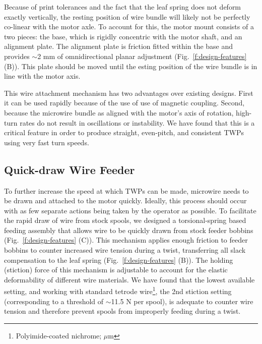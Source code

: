 \documentclass[11pt,a4paper]{article}
\begin{document}
Because of print tolerances and the fact that the leaf spring does not deform
exactly vertically, the resting position of wire bundle will likely not be
perfectly co-linear with the motor axle. To account for this, the motor mount
consists of a two pieces: the base, which is rigidly concentric with the motor
shaft, and an alignment plate. The alignment plate is friction fitted within
the base and provides $\sim$2 mm of omnidirectional planar adjustment
(Fig.~\ref{f:design-features} (B)). This plate should be moved until the
esting position of the wire bundle is in line with the motor axis.

This wire attachment mechanism has two advantages over existing designs. First it
can be used rapidly because of the use of use of magnetic coupling. Second,
because the microwire bundle as aligned with the motor's axis of rotation,
high-turn rates do not result in oscillations or instability. We have found
that this is a critical feature in order to produce straight, even-pitch, and
consistent TWPs using very fast turn speeds.

\subsection{Quick-draw Wire Feeder}
To further increase the speed at which TWPs can be made, microwire needs to be
drawn and attached to the motor quickly. Ideally, this process should occur
with as few separate actions being taken by the operator as possible. To
facilitate the rapid draw of wire from stock spools, we designed a
torsional-spring based feeding assembly that allows wire to be quickly drawn
from stock feeder bobbins (Fig.~\ref{f:design-features} (C)). This mechanism
applies enough friction to feeder bobbins to counter increased wire tension
during a twist, transferring all slack compensation to the leaf spring
(Fig.~\ref{f:design-features} (B)). The holding (stiction) force of this
mechanism is adjustable to account for the elastic deformability of different
wire materials. We have found that the lowest available setting, and working
with standard tetrode wire\footnote{Polyimide-coated nichrome;
$\mu$m}, the 2nd stiction setting (corresponding to a threshold of
$\sim$11.5 N per spool), is adequate to counter wire tension and therefore
prevent spools from improperly feeding during a twist.
\end{document}
